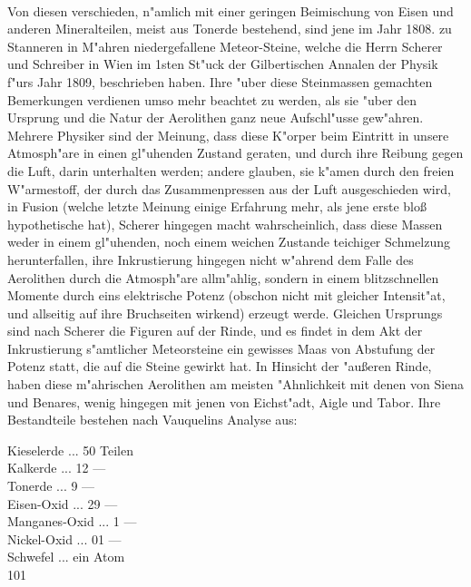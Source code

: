 \documentclass[a4paper, 11pt, oneside, polutonikogreek, german]{article}
\begin{document}
\paragraph{}
Von diesen verschieden, n"amlich mit einer geringen Beimischung von Eisen und anderen Mineralteilen, meist aus Tonerde bestehend, sind jene im Jahr 1808. zu Stanneren in M"ahren niedergefallene Meteor-Steine, welche die Herrn Scherer und Schreiber in Wien im 1sten St"uck der Gilbertischen Annalen der Physik f"urs Jahr 1809, beschrieben haben. Ihre "uber diese Steinmassen gemachten Bemerkungen verdienen umso mehr beachtet zu werden, als sie "uber den Ursprung und die Natur der Aerolithen ganz neue Aufschl"usse gew"ahren. Mehrere Physiker sind der Meinung, dass diese K"orper beim Eintritt in unsere Atmosph"are in einen gl"uhenden Zustand geraten, und durch ihre Reibung gegen die Luft, darin unterhalten werden; andere glauben, sie k"amen durch den freien W"armestoff, der durch das Zusammenpressen aus der Luft ausgeschieden wird, in Fusion (welche letzte Meinung einige Erfahrung mehr, als jene erste bloß hypothetische hat), Scherer hingegen macht wahrscheinlich, dass diese Massen weder in einem gl"uhenden, noch einem weichen Zustande teichiger Schmelzung herunterfallen, ihre Inkrustierung hingegen nicht w"ahrend dem Falle des Aerolithen durch die Atmosph"are allm"ahlig, sondern in einem blitzschnellen Momente durch eins elektrische Potenz (obschon nicht mit gleicher Intensit"at, und allseitig auf ihre Bruchseiten wirkend) erzeugt werde. Gleichen Ursprungs sind nach Scherer die Figuren auf der Rinde, und es findet in dem Akt der Inkrustierung s"amtlicher Meteorsteine ein gewisses Maas von Abstufung der Potenz statt, die auf die Steine gewirkt hat. In Hinsicht der "außeren Rinde, haben diese m"ahrischen Aerolithen am meisten "Ahnlichkeit mit denen von Siena und Benares, wenig hingegen mit jenen von Eichst"adt, Aigle und Tabor. Ihre Bestandteile bestehen nach Vauquelins Analyse aus:

Kieselerde ... 50 Teilen\\
\hspace*{0.5cm} Kalkerde ... 12 ---\\
\hspace*{0.5cm} Tonerde ... 9 ---\\
\hspace*{0.5cm} Eisen-Oxid ... 29 ---\\
\hspace*{0.5cm} Manganes-Oxid ... 1 ---\\
\hspace*{0.5cm} Nickel-Oxid ... 01 ---\\
\hspace*{0.5cm} Schwefel ... ein Atom\\
\hspace*{2.5cm} 101
\end{document}
